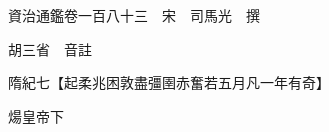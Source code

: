 










 


 
 


 

  
  
  
  
  





  
  
  
  
  
 
  

  

  
  
  



  

 
 

  
   




  

  
  


  　　資治通鑑卷一百八十三　宋　司馬光　撰

　　胡三省　音註

　　隋紀七【起柔兆困敦盡彊圉赤奮若五月凡一年有奇】

　　煬皇帝下

